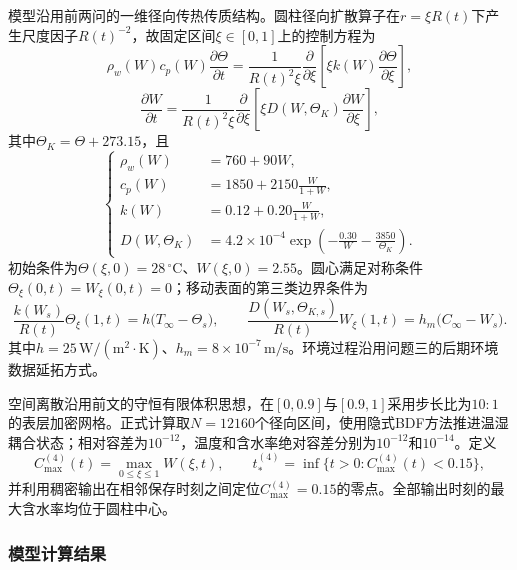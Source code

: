 \documentclass[withoutpreface,bwprint]{cumcmthesis}
\begin{document}
模型沿用前两问的一维径向传热传质结构。圆柱径向扩散算子在$r=\xi R(t)$下产生尺度因子$R(t)^{-2}$，故固定区间$\xi\in[0,1]$上的控制方程为
\begin{equation}
\boxed{
\rho_w(W)c_p(W)\frac{\partial\Theta}{\partial t}
=\frac{1}{R(t)^2\xi}
\frac{\partial}{\partial\xi}
\left[\xi k(W)\frac{\partial\Theta}{\partial\xi}\right],
}
\label{eq:q4-main-heat}
\end{equation}
\begin{equation}
\boxed{
\frac{\partial W}{\partial t}
=\frac{1}{R(t)^2\xi}
\frac{\partial}{\partial\xi}
\left[\xi D(W,\Theta_K)\frac{\partial W}{\partial\xi}\right],
}
\label{eq:q4-main-moisture}
\end{equation}
其中$\Theta_K=\Theta+273.15$，且
\begin{equation}
\left\{
\begin{aligned}
\rho_w(W)&=760+90W,\\
c_p(W)&=1850+2150\frac{W}{1+W},\\
k(W)&=0.12+0.20\frac{W}{1+W},\\
D(W,\Theta_K)&=4.2\times10^{-4}
\exp\!\left(-\frac{0.30}{W}-\frac{3850}{\Theta_K}\right).
\end{aligned}
\right.
\label{eq:q4-main-properties}
\end{equation}
初始条件为$\Theta(\xi,0)=28\,{}^\circ\mathrm C$、$W(\xi,0)=2.55$。圆心满足对称条件$\Theta_\xi(0,t)=W_\xi(0,t)=0$；移动表面的第三类边界条件为
\begin{equation}
\frac{k(W_s)}{R(t)}\Theta_\xi(1,t)
=h\bigl(T_\infty-\Theta_s\bigr),
\qquad
\frac{D(W_s,\Theta_{K,s})}{R(t)}W_\xi(1,t)
=h_m\bigl(C_\infty-W_s\bigr).
\label{eq:q4-main-boundary}
\end{equation}
其中$h=25\,\mathrm{W/(m^2\cdot K)}$、$h_m=8\times10^{-7}\,\mathrm{m/s}$。环境过程沿用问题三的后期环境数据延拓方式。

空间离散沿用前文的守恒有限体积思想，在$[0,0.9]$与$[0.9,1]$采用步长比为$10:1$的表层加密网格。正式计算取$N=12160$个径向区间，使用隐式BDF方法推进温湿耦合状态；相对容差为$10^{-12}$，温度和含水率绝对容差分别为$10^{-12}$和$10^{-14}$。定义
\begin{equation}
C_{\max}^{(4)}(t)=\max_{0\le\xi\le1}W(\xi,t),
\qquad
t_*^{(4)}=\inf\{t>0:C_{\max}^{(4)}(t)<0.15\},
\label{eq:q4-main-event}
\end{equation}
并利用稠密输出在相邻保存时刻之间定位$C_{\max}^{(4)}=0.15$的零点。全部输出时刻的最大含水率均位于圆柱中心。

\subsubsection{模型计算结果}
\end{document}
